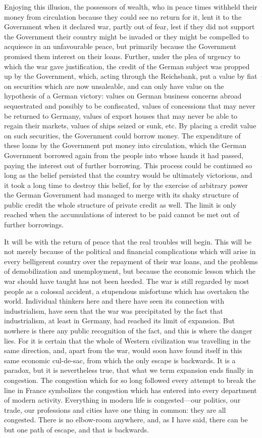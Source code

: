 \documentclass{book}
\begin{document}
Enjoying this illusion, the possessors of wealth, who in peace times withheld their money from circulation because they could see no return for it, lent it to the Government when it declared war, partly out of fear, lest if they did not support the Government their country might be invaded or they might be compelled to acquiesce in an unfavourable peace, but primarily because the Government promised them interest on their loans. Further, under the plea of urgency to which the war gave justification, the credit of the German subject was propped up by the Government, which, acting through the Reichsbank, put a value by fiat on securities which are now unsaleable, and can only have value on the hypothesis of a German victory: values on German business concerns abroad sequestrated and possibly to be confiscated, values of concessions that may never be returned to Germany, values of export houses that may never be able to regain their markets, values of ships seized or sunk, etc. By placing a credit value on such securities, the Government could borrow money. The expenditure of these loans by the Government put money into circulation, which the German Government borrowed again from the people into whose hands it had passed, paying the interest out of further borrowing. This process could be continued so long as the belief persisted that the country would be ultimately victorious, and it took a long time to destroy this belief, for by the exercise of arbitrary power the German Government had managed to merge with its shaky structure of public credit the whole structure of private credit as well. The limit is only reached when the accumulations of interest to be paid cannot be met out of further borrowings.

It will be with the return of peace that the real troubles will begin. This will be not merely because of the political and financial complications which will arise in every belligerent country over the repayment of their war loans, and the problems of demobilization and unemployment, but because the economic lesson which the war should have taught has not been heeded. The war is still regarded by most people as a colossal accident, a stupendous misfortune which has overtaken the world. Individual thinkers here and there have seen its connection with industrialism, have seen that the war was precipitated by the fact that industrialism, at least in Germany, had reached its limit of expansion. But nowhere is there any public recognition of the fact, and this is where the danger lies. For it is certain that the whole of Western civilization was travelling in the same direction, and, apart from the war, would soon have found itself in this same economic cul-de-sac, from which the only escape is backwards. It is a paradox, but it is nevertheless true, that what we term expansion ends finally in congestion. The congestion which for so long followed every attempt to break the line in France symbolizes the congestion which has entered into every department of modern activity. Everything in modern life is congested—our politics, our trade, our professions and cities have one thing in common: they are all congested. There is no elbow-room anywhere, and, as I have said, there can be but one path of escape, and that is backwards.
\end{document}
